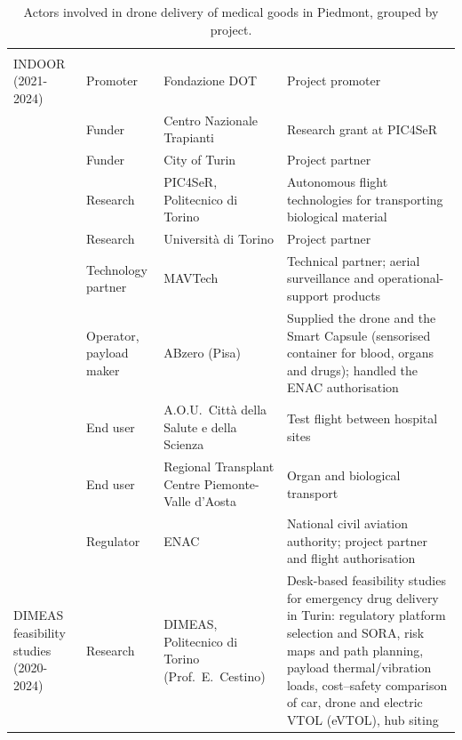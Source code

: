 {\longtablesetup
\begin{longtable}{G{0.14} L{0.17} L{0.27} L{0.42}}
\caption{Actors involved in drone delivery of medical goods in Piedmont, grouped by project.}
\label{tab:actors-piedmont}\\
\headrow{} &  &  &  \\
\endfirsthead
\headrow{} &  &  &  \\
\endhead
{}
\endfoot
\lastrule
\endlastfoot

INDOOR (2021-2024)
& Promoter & Fondazione DOT & Project promoter \cite{dot_indoor} \\
& Funder & Centro Nazionale Trapianti & Research grant at PIC4SeR \cite{dot_grant} \\
& Funder & City of Turin & Project partner \cite{dot_indoor} \\
& Research & PIC4SeR, Politecnico di Torino & Autonomous flight technologies for transporting biological material \cite{polito_pic4ser} \\
& Research & Universit\`a di Torino & Project partner \cite{dot_indoor} \\
& Technology partner & MAVTech & Technical partner; aerial surveillance and operational-support products \cite{dot_indoor} \\
& Operator, payload maker & ABzero (Pisa) & Supplied the drone and the Smart Capsule (sensorised container for blood, organs and drugs); handled the ENAC authorisation \cite{abzero_web, cds_indoor, dot_grant, tecnomedicina_indoor} \\
& End user & A.O.U.\ Citt\`a della Salute e della Scienza & Test flight between hospital sites \cite{cds_indoor} \\
& End user & Regional Transplant Centre Piemonte-Valle d'Aosta & Organ and biological transport \cite{dot_indoor} \\
& Regulator & ENAC & National civil aviation authority; project partner and flight authorisation \cite{dot_indoor} \\
\grouprule
DIMEAS feasibility studies (2020-2024)
& Research & DIMEAS, Politecnico di Torino (Prof.~E.~Cestino) & Desk-based feasibility studies for emergency drug delivery in Turin: regulatory platform selection and SORA, risk maps and path planning, payload thermal/vibration loads, cost--safety comparison of car, drone and electric VTOL (eVTOL), hub siting \cite{Cavallo2020, Bertelli2021, Sivieri2021, Fiorentino2021, Angelini2023, Angelini2024ICAS} \\

\end{longtable}}
